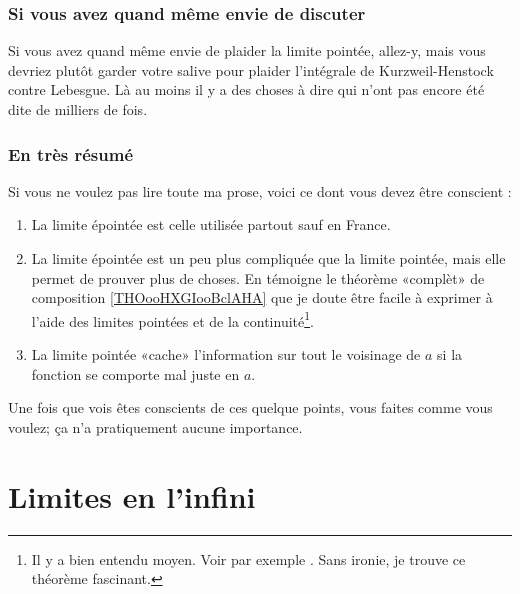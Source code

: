 \subsubsection{Si vous avez quand même envie de discuter}

Si vous avez quand même envie de plaider la limite pointée, allez-y, mais vous devriez plutôt garder votre salive pour plaider l'intégrale de Kurzweil-Henstock\cite{BIBooLGJXooZhEXJf} contre Lebesgue. Là au moins il y a des choses à dire qui n'ont pas encore été dite de milliers de fois.

\subsubsection{En très résumé}

Si vous ne voulez pas lire toute ma prose, voici ce dont vous devez être conscient :
\begin{enumerate}
    \item
        La limite épointée est celle utilisée partout sauf en France.
    \item
        La limite épointée est un peu plus compliquée que la limite pointée, mais elle permet de prouver plus de choses. En témoigne le théorème «complèt» de composition \ref{THOooHXGIooBclAHA} que je doute être facile à exprimer à l'aide des limites pointées et de la continuité\footnote{Il y a bien entendu moyen. Voir par exemple \cite{BIBooDAGXooRltbgK}. Sans ironie, je trouve ce théorème fascinant.}.
    \item
        La limite pointée «cache» l'information sur tout le voisinage de \( a\) si la fonction se comporte mal juste en \( a\). 
\end{enumerate}
Une fois que vois êtes conscients de ces quelque points, vous faites comme vous voulez; ça n'a pratiquement aucune importance.

\section{Limites en l'infini}

